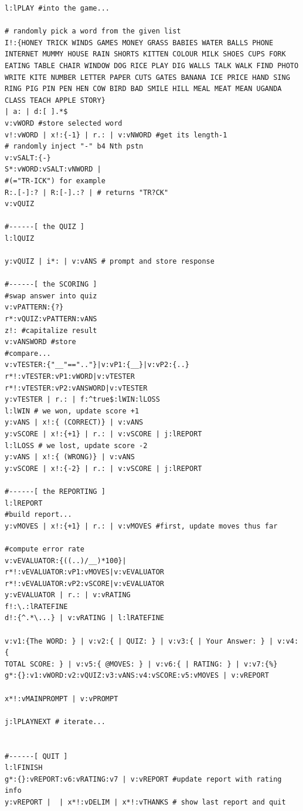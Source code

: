\documentclass[a4paper, 18pt]{book} %
\begin{document}
{{{{\begin{tcolorbox}[teaterminalstyle, title=TEA Program:  SIR GAME v3, breakable]
\begin{lstlisting}[language=TEA,breaklines=true,]
l:lPLAY #into the game...

# randomly pick a word from the given list
I!:{HONEY TRICK WINDS GAMES MONEY GRASS BABIES WATER BALLS PHONE INTERNET MUMMY HOUSE RAIN SHORTS KITTEN COLOUR MILK SHOES CUPS FORK EATING TABLE CHAIR WINDOW DOG RICE PLAY DIG WALLS TALK WALK FIND PHOTO WRITE KITE NUMBER LETTER PAPER CUTS GATES BANANA ICE PRICE HAND SING RING PIG PIN PEN HEN COW BIRD BAD SMILE HILL MEAL MEAT MEAN UGANDA CLASS TEACH APPLE STORY} 
| a: | d:[ ].*$ 
v:vWORD #store selected word
v!:vWORD | x!:{-1} | r.: | v:vNWORD #get its length-1
# randomly inject "-" b4 Nth pstn 
v:vSALT:{-}
S*:vWORD:vSALT:vNWORD | 
#(="TR-ICK") for example
R:.[-]:? | R:[-].:? | # returns "TR?CK"
v:vQUIZ

#------[ the QUIZ ]
l:lQUIZ 

y:vQUIZ | i*: | v:vANS # prompt and store response

#------[ the SCORING ]
#swap answer into quiz
v:vPATTERN:{?}
r*:vQUIZ:vPATTERN:vANS
z!: #capitalize result
v:vANSWORD #store
#compare...
v:vTESTER:{"__"==".."}|v:vP1:{__}|v:vP2:{..}
r*!:vTESTER:vP1:vWORD|v:vTESTER
r*!:vTESTER:vP2:vANSWORD|v:vTESTER
y:vTESTER | r.: | f:^true$:lWIN:lLOSS
l:lWIN # we won, update score +1
y:vANS | x!:{ (CORRECT)} | v:vANS
y:vSCORE | x!:{+1} | r.: | v:vSCORE | j:lREPORT 
l:lLOSS # we lost, update score -2
y:vANS | x!:{ (WRONG)} | v:vANS
y:vSCORE | x!:{-2} | r.: | v:vSCORE | j:lREPORT 

#------[ the REPORTING ]
l:lREPORT
#build report...
y:vMOVES | x!:{+1} | r.: | v:vMOVES #first, update moves thus far

#compute error rate
v:vEVALUATOR:{((..)/__)*100}|
r*!:vEVALUATOR:vP1:vMOVES|v:vEVALUATOR
r*!:vEVALUATOR:vP2:vSCORE|v:vEVALUATOR
y:vEVALUATOR | r.: | v:vRATING 
f!:\.:lRATEFINE
d!:{^.*\...} | v:vRATING | l:lRATEFINE

v:v1:{The WORD: } | v:v2:{ | QUIZ: } | v:v3:{ | Your Answer: } | v:v4:{
TOTAL SCORE: } | v:v5:{ @MOVES: } | v:v6:{ | RATING: } | v:v7:{%}
g*:{}:v1:vWORD:v2:vQUIZ:v3:vANS:v4:vSCORE:v5:vMOVES | v:vREPORT

x*!:vMAINPROMPT | v:vPROMPT

j:lPLAYNEXT # iterate...


#------[ QUIT ]
l:lFINISH
g*:{}:vREPORT:v6:vRATING:v7 | v:vREPORT #update report with rating info
y:vREPORT |  | x*!:vDELIM | x*!:vTHANKS # show last report and quit
   \end{lstlisting}
  \end{tcolorbox}
  \caption{TEA APPLICATION: SIR GAME v3}
  \label{FIGS2}
}


}}}
\end{document}
